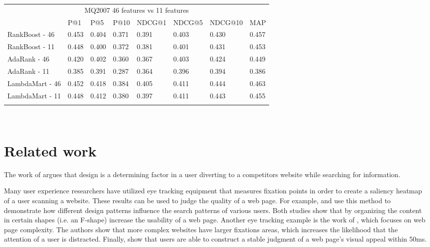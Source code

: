 
\begin{table}[t]
\begin{center}
\begin{tabular}{llllllll}
\multicolumn{8}{c}{MQ2007 46 features vs 11 features}                                     \\
           & P@1    & P@5    & P@10   & NDCG@1 & NDCG@5 & NDCG@10 & MAP    \\ \hline
RankBoost - 46  & 0.453 & 0.404 & 0.371 & 0.391 & 0.403 & 0.430  & 0.457 \\
RankBoost - 11 & 0.448 & 0.400 & 0.372 & 0.381  & 0.401  & 0.431   & 0.453 \\ \hline
AdaRank - 46  & 0.420 & 0.402 & 0.360 & 0.367 & 0.403 & 0.424  & 0.449 \\
AdaRank - 11  & 0.385 & 0.391 & 0.287 & 0.364  & 0.396  & 0.394   & 0.386 \\ \hline
LambdaMart - 46 & 0.452 & 0.418 & 0.384 & 0.405 & 0.411 & 0.444  & 0.463 \\
LambdaMart - 11 & 0.448 & 0.412 & 0.380 & 0.397  & 0.411  & 0.443   & 0.455 \\
\hline
\\
\end{tabular}
\\
\label{tab:11vs46}
\end{center}
\end{table}


\section{Related work}\label{sec:relatedwork}
The work of \citet{nielsen1999designing} argues that design is a determining factor in a user diverting to a competitors website while searching for information.

Many user experience researchers have utilized eye tracking equipment that measures fixation points in order to create a saliency heatmap of a user scanning a website. These results can be used to judge the quality of a web page. For example, \citet{nielsen2006f} and \citet{pernice2017f} use this method to demonstrate how different design patterns influence the search patterns of various users. Both studies show that by organizing the content in certain shapes (i.e. an F-shape) increase the usability of a web page. Another eye tracking example is the work of \citet{wang2014eye}, which focuses on web page complexity. The authors show that more complex websites have larger fixations areas, which increases the likelihood that the attention of a user is distracted. Finally, \citet{lindgaard2006attention} show that users are able to construct a stable judgment of a web page's visual appeal within 50ms. 

